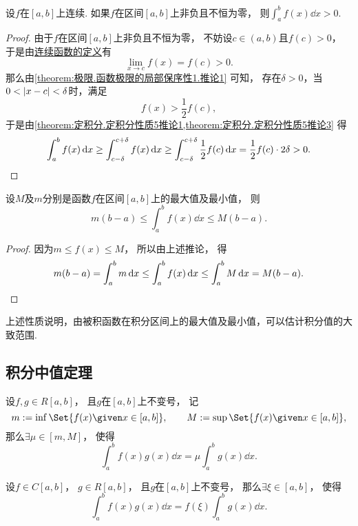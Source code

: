 \begin{corollary}
设\(f\)在\([a,b]\)上连续.
如果\(f\)在区间\([a,b]\)上非负且不恒为零，
则\(\int_a^b f(x) \dd{x} > 0\).
\begin{proof}
由于\(f\)在区间\([a,b]\)上非负且不恒为零，
不妨设\(c \in (a,b)\)且\(f(c)>0\)，
于是由\hyperref[definition:极限.函数在一点的连续性]{连续函数的定义}有\[
	\lim_{x \to c} f(x) = f(c) > 0.
\]
那么由\cref{theorem:极限.函数极限的局部保序性1.推论1} 可知，
存在\(\delta>0\)，当\(0 < \abs{x-c} < \delta\)时，满足\[
	f(x) > \frac12 f(c),
\]
于是由\cref{theorem:定积分.定积分性质5推论1,theorem:定积分.定积分性质5推论3} 得\[
	\int_a^b f(x) \dd{x}
	\geq \int_{c-\delta}^{c+\delta} f(x) \dd{x}
	\geq \int_{c-\delta}^{c+\delta} \frac12 f(c) \dd{x}
	= \frac12 f(c) \cdot 2 \delta
	> 0.
	\qedhere
\]
\end{proof}
\end{corollary}

\begin{property}\label{theorem:定积分.定积分性质6}
设\(M\)及\(m\)分别是函数\(f\)在区间\([a,b]\)上的最大值及最小值，
则\[
	m(b-a) \leq \int_a^b f(x) \dd{x} \leq M(b-a).
\]
\begin{proof}
因为\(m \leq f(x) \leq M\)，
所以由上述推论，
得\[
	m(b-a)
	= \int_a^b m \dd{x}
	\leq \int_a^b f(x) \dd{x}
	\leq \int_a^b M \dd{x}
	= M(b-a).
	\qedhere
\]
\end{proof}
\end{property}
上述性质说明，由被积函数在积分区间上的最大值及最小值，可以估计积分值的大致范围.

\subsection{积分中值定理}
\begin{theorem}[积分第一中值定理]\label{theorem:定积分.积分中值定理1}
设\(f,g \in R[a,b]\)，
且\(g\)在\([a,b]\)上不变号，
记\[
	m \defeq \inf\Set{ f(x) \given x \in [a,b] }, \qquad
	M \defeq \sup\Set{ f(x) \given x \in [a,b] },
\]
那么\(\exists\mu\in[m,M]\)，
使得\begin{equation}
	\int_a^b f(x) g(x) \dd{x} = \mu \int_a^b g(x) \dd{x}.
\end{equation}
\end{theorem}

\begin{corollary}\label{theorem:定积分.积分中值定理1推论1}
设\(f \in C[a,b]\)，
\(g \in R[a,b]\)，
且\(g\)在\([a,b]\)上不变号，
那么\(\exists\xi\in[a,b]\)，
使得\begin{equation}
	\int_a^b f(x) g(x) \dd{x}
	= f(\xi) \int_a^b g(x) \dd{x}.
\end{equation}
\end{corollary}

